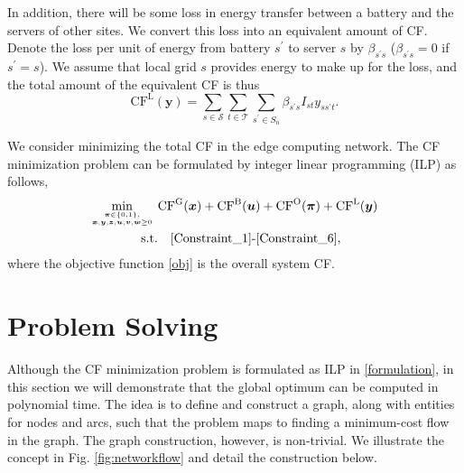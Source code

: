 \documentclass[conference, 10pt, ﬁnal, letterpaper, twocolumn]{IEEEtran}
\begin{document}
In addition, there will be some loss in energy transfer between a battery and the servers of other sites. We convert this loss into an equivalent amount of CF. Denote the loss per unit of energy from battery $s^\prime$ to server $s$ by $\beta_{s^\prime s}$ ($\beta_{s^\prime s} = 0$ if $s^\prime = s$). We assume that local grid $s$ provides energy to make up for the loss, and the total amount of the equivalent CF is thus 
\begin{equation}\label{CF_energy_loss}
    \text{CF}^{\text{L}}(\boldsymbol{y}) = \sum_{s \in \mathcal{S}}  \sum_{t \in \mathcal{T}}\sum_{s^\prime \in S_n}  \beta_{s^\prime s} I_{st} y _{ss^\prime t}.
\end{equation}

We consider minimizing the total CF in the edge computing network. The CF minimization problem can be formulated by integer linear programming (ILP) as follows,
\begin{subequations}\label{formulation}
    \begin{align}
         \mathop{\min}_{\boldsymbol{\pi} \in \{0,1\}, \atop \boldsymbol{x}, \boldsymbol{y}, \boldsymbol{z}, \boldsymbol{u}, \boldsymbol{v}, \boldsymbol{w} \geq 0} \ & \text{CF}^{\text{G}}(\boldsymbol{x}) +  \text{CF}^{\text{B}}(\boldsymbol{u}) + \text{CF}^{\text{O}}(\boldsymbol{\pi}) + \text{CF}^{\text{L}}(\boldsymbol{y}) \label{obj}\\
         \text{s.t.} & \quad \eqref{Constraint_1} \text{-} \eqref{Constraint_6},\notag
    \end{align}
\end{subequations}
where the objective function \eqref{obj} is the overall system CF.


\section{Problem Solving} 



Although the CF minimization problem is formulated as ILP in \eqref{formulation}, in this section we will demonstrate that the global optimum can be computed in polynomial time. The idea is to define and construct a graph, along with entities for nodes and arcs, such that the problem maps to finding a minimum-cost flow in the graph. The graph construction, however, is non-trivial. We illustrate the concept in Fig. \ref{fig:networkflow} and detail the construction below.
\end{document}
